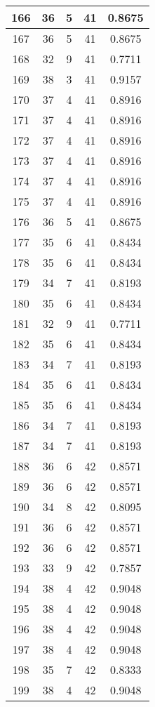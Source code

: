 \documentclass[letterpaper, 12pt]{article}
\begin{document}
\begin{longtable}{|c|c|c|c|c|}
\hline
166 & 36 & 5 & 41 & 0.8675 \\
\hline
167 & 36 & 5 & 41 & 0.8675 \\
\hline
168 & 32 & 9 & 41 & 0.7711 \\
\hline
169 & 38 & 3 & 41 & 0.9157 \\
\hline
170 & 37 & 4 & 41 & 0.8916 \\
\hline
171 & 37 & 4 & 41 & 0.8916 \\
\hline
172 & 37 & 4 & 41 & 0.8916 \\
\hline
173 & 37 & 4 & 41 & 0.8916 \\
\hline
174 & 37 & 4 & 41 & 0.8916 \\
\hline
175 & 37 & 4 & 41 & 0.8916 \\
\hline
176 & 36 & 5 & 41 & 0.8675 \\
\hline
177 & 35 & 6 & 41 & 0.8434 \\
\hline
178 & 35 & 6 & 41 & 0.8434 \\
\hline
179 & 34 & 7 & 41 & 0.8193 \\
\hline
180 & 35 & 6 & 41 & 0.8434 \\
\hline
181 & 32 & 9 & 41 & 0.7711 \\
\hline
182 & 35 & 6 & 41 & 0.8434 \\
\hline
183 & 34 & 7 & 41 & 0.8193 \\
\hline
184 & 35 & 6 & 41 & 0.8434 \\
\hline
185 & 35 & 6 & 41 & 0.8434 \\
\hline
186 & 34 & 7 & 41 & 0.8193 \\
\hline
187 & 34 & 7 & 41 & 0.8193 \\
\hline
188 & 36 & 6 & 42 & 0.8571 \\
\hline
189 & 36 & 6 & 42 & 0.8571 \\
\hline
190 & 34 & 8 & 42 & 0.8095 \\
\hline
191 & 36 & 6 & 42 & 0.8571 \\
\hline
192 & 36 & 6 & 42 & 0.8571 \\
\hline
193 & 33 & 9 & 42 & 0.7857 \\
\hline
194 & 38 & 4 & 42 & 0.9048 \\
\hline
195 & 38 & 4 & 42 & 0.9048 \\
\hline
196 & 38 & 4 & 42 & 0.9048 \\
\hline
197 & 38 & 4 & 42 & 0.9048 \\
\hline
198 & 35 & 7 & 42 & 0.8333 \\
\hline
199 & 38 & 4 & 42 & 0.9048 \\
\hline
\end{longtable}
\end{document}
